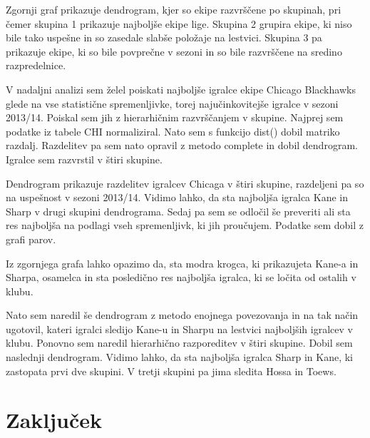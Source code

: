 \documentclass[11pt,a4paper]{article}
\begin{document}
Zgornji graf prikazuje dendrogram, kjer so ekipe razvrščene po skupinah, pri čemer skupina 1 prikazuje najboljše ekipe lige. Skupina 2 grupira ekipe, ki niso bile tako uspešne in so zasedale slabše položaje na lestvici. Skupina 3 pa prikazuje ekipe, ki so bile povprečne v sezoni in so bile razvrščene na sredino razpredelnice.

V nadaljni analizi sem želel poiskati najboljše igralce ekipe Chicago Blackhawks glede na vse statistične spremenljivke, torej najučinkovitejše igralce v sezoni 2013/14. Poiskal sem jih z hierarhičnim razvrščanjem v skupine. Najprej sem podatke iz tabele CHI normaliziral. Nato sem s funkcijo dist() dobil matriko razdalj. Razdelitev pa sem nato opravil z metodo complete in dobil dendrogram. Igralce sem razvrstil v štiri skupine.


Dendrogram prikazuje razdelitev igralcev Chicaga v štiri skupine, razdeljeni pa so na uspešnost v sezoni 2013/14. Vidimo lahko, da sta najboljša igralca Kane in Sharp v drugi skupini dendrograma. Sedaj pa sem se odločil še preveriti ali sta res najboljša na podlagi vseh spremenljivk, ki jih proučujem. Podatke sem dobil z grafi parov.


Iz zgornjega grafa lahko opazimo da, sta modra krogca, ki prikazujeta Kane-a in Sharpa, osamelca in sta posledično res najboljša igralca, ki se ločita od ostalih v klubu.


Nato sem naredil še dendrogram z metodo enojnega povezovanja in na tak način ugotovil, kateri igralci sledijo Kane-u in Sharpu na lestvici najboljših igralcev v klubu. Ponovno sem naredil hierarhično razporeditev v štiri skupine. Dobil sem naslednji dendrogram. Vidimo lahko, da sta najboljša igralca Sharp in Kane, ki zastopata prvi dve skupini. V tretji skupini pa jima sledita Hossa in Toews. 


\newpage
\section{Zaključek}
\end{document}
